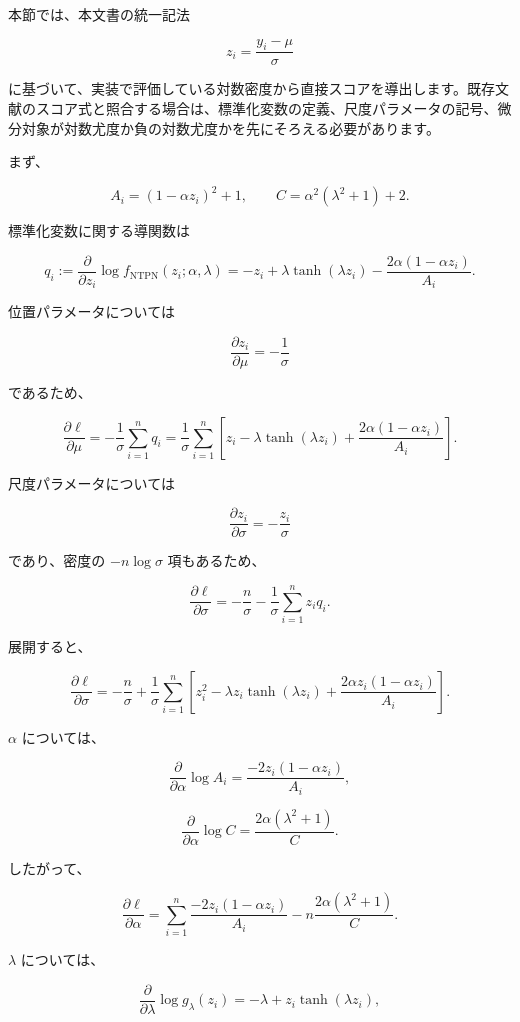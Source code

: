 \documentclass[
]{article}
\begin{document}
本節では、本文書の統一記法

\[
z_i=\frac{y_i-\mu}{\sigma}
\]

に基づいて、実装で評価している対数密度から直接スコアを導出します。既存文献のスコア式と照合する場合は、標準化変数の定義、尺度パラメータの記号、微分対象が対数尤度か負の対数尤度かを先にそろえる必要があります。

まず、

\[
A_i=(1-\alpha z_i)^2+1,
\qquad
C=\alpha^2(\lambda^2+1)+2.
\]

標準化変数に関する導関数は

\[
q_i:=\frac{\partial}{\partial z_i}\log f_{\mathrm{NTPN}}(z_i;\alpha,\lambda)
=-z_i+\lambda\tanh(\lambda z_i)
-\frac{2\alpha(1-\alpha z_i)}{A_i}.
\]

位置パラメータについては

\[
\frac{\partial z_i}{\partial\mu}=-\frac{1}{\sigma}
\]

であるため、

\[
\frac{\partial \ell}{\partial \mu}
=-\frac{1}{\sigma}\sum_{i=1}^{n}q_i
=\frac{1}{\sigma}\sum_{i=1}^{n}
\left[z_i-\lambda\tanh(\lambda z_i)+\frac{2\alpha(1-\alpha z_i)}{A_i}\right].
\]

尺度パラメータについては

\[
\frac{\partial z_i}{\partial\sigma}=-\frac{z_i}{\sigma}
\]

であり、密度の \(-n\log\sigma\) 項もあるため、

\[
\frac{\partial \ell}{\partial \sigma}
=-\frac{n}{\sigma}-\frac{1}{\sigma}\sum_{i=1}^{n}z_iq_i.
\]

展開すると、

\[
\frac{\partial \ell}{\partial \sigma}
=-\frac{n}{\sigma}+\frac{1}{\sigma}\sum_{i=1}^{n}
\left[z_i^2-\lambda z_i\tanh(\lambda z_i)
+\frac{2\alpha z_i(1-\alpha z_i)}{A_i}\right].
\]

\(\alpha\) については、

\[
\frac{\partial}{\partial\alpha}\log A_i
=\frac{-2z_i(1-\alpha z_i)}{A_i},
\]

\[
\frac{\partial}{\partial\alpha}\log C
=\frac{2\alpha(\lambda^2+1)}{C}.
\]

したがって、

\[
\frac{\partial \ell}{\partial \alpha}
=\sum_{i=1}^{n}\frac{-2z_i(1-\alpha z_i)}{A_i}
-n\frac{2\alpha(\lambda^2+1)}{C}.
\]

\(\lambda\) については、

\[
\frac{\partial}{\partial\lambda}\log g_\lambda(z_i)
=-\lambda+z_i\tanh(\lambda z_i),
\]
\end{document}
